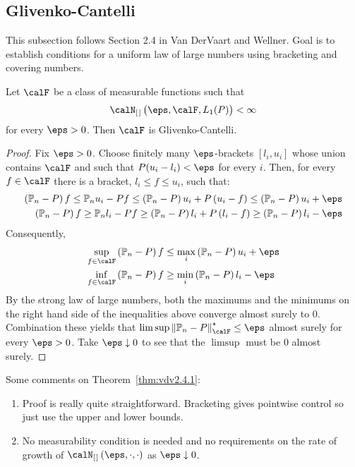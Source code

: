 \subsection{Glivenko-Cantelli}%

This subsection follows Section 2.4 in Van DerVaart and Wellner. Goal is to establish conditions for a uniform law of large numbers using bracketing and covering numbers.

\begin{theorem}
	\label{thm:vdv2.4.1}
	Let \(\calF\) be a class of measurable functions such that  \[\calN_{[\hspace{0.1em}]}\left(\eps,\calF,L_1(P)\right)<\infty\] for every \(\eps>0\). Then  \(\calF\) is Glivenko-Cantelli. 
\end{theorem}
\begin{proof}
	Fix \(\eps > 0\). Choose finitely many \(\eps\)-brackets \([l_i,u_i]\) whose union contains \(\calF\) and such that \(P(u_i-l_i)<\eps\) for every \(i\). Then, for every \(f\in\calF\) there is a bracket, \(l_i \leq f \leq u_i \), such that:
	\begin{align*}
		\left(\P_n-P\right)f \leq \P_n u_i - Pf\leq \left(\P_n-P\right)u_i + P\left(u_i - f\right) \leq \left(\P_n-P\right)u_i + \eps \\ 
		\left(\P_n-P\right)f \geq \P_n l_i - Pf\geq \left(\P_n-P\right)l_i + P\left(l_i - f\right) \geq \left(\P_n-P\right)l_i - \eps 
	\end{align*}
	Consequently,
	\begin{align*}
			\sup_{f\in\calF}\left(\P_n-P\right)f &\leq \max_i \left(\P_n-P\right)u_i + \eps \\
			\inf_{f\in\calF}\left(\P_n-P\right)f &\geq \min_i \left(\P_n-P\right)l_i -\eps
	\end{align*}
	By the strong law of large numbers, both the maximums and the minimums on the right hand side of the inequalities above converge almost surely to 0. Combination these yields that \(\lim\sup\left\|\P_n-P\right\|^\star_\calF \leq \eps\) almost surely for every \(\eps > 0\). Take  \(\eps\downarrow 0\) to see that the \(\limsup\) must be  \(0\) almost surely. 
\end{proof}
\begin{remark*}
	Some comments on Theorem~\ref{thm:vdv2.4.1}:
	\begin{enumerate}
		\item Proof is really quite straightforward. Bracketing gives pointwise control so just use the upper and lower bounds.
		\item No measurability condition is needed and no requirements on the rate of growth of \(\calN_{[\hspace{0.1em}]}\left(\eps,\cdot,\cdot\right)\) as \(\eps\downarrow 0\).
	\end{enumerate}
\end{remark*}
